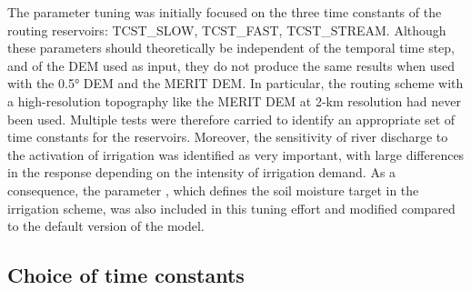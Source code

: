The parameter tuning was initially focused on the three time constants of the routing reservoirs: TCST\_SLOW, TCST\_FAST, TCST\_STREAM. 
Although these parameters should theoretically be independent of the temporal time step, and of the DEM used as input, they do not produce the same results when used with the 0.5° DEM and the MERIT DEM.
In particular, the \native routing scheme with a high-resolution topography like the MERIT DEM at 2-km resolution  had never been used.
Multiple tests were therefore carried to identify an appropriate set of time constants for the reservoirs.
Moreover, the sensitivity of river discharge to the activation of irrigation was identified as very important, %
with large differences in the response depending on the intensity of irrigation demand. As a consequence, the parameter \betairrig, which defines the soil moisture target in the irrigation scheme, was also included in this tuning effort and modified compared to the default version of the model.

\subsection{Choice of time constants}


